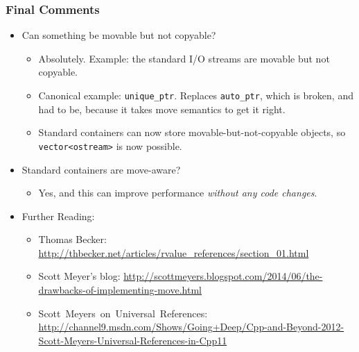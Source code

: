 \begin{frame}[fragile]
\frametitle{Final Comments}
\begin{itemize}

\item Can something be movable but not copyable?
\pause
      \begin{itemize}
      \item Absolutely.  Example: the standard I/O streams are movable but not
      copyable.
      \item Canonical example: \texttt{unique\_ptr}.  Replaces \texttt{auto\_ptr}, which
      is broken, and had to be, because it takes move semantics to get
      it right.
      \item Standard containers can now store
      movable-but-not-copyable objects, so \texttt{vector<ostream>} is now possible.
      \end{itemize}

\vskip 6pt
\pause
\item Standard containers are move-aware?
\pause
      \begin{itemize}
      \item Yes, and this can improve performance \emph{without any
      code changes}.
      \end{itemize}

\vskip 6pt

\pause
\item Further Reading:
      \begin{itemize}
      \item Thomas Becker: {\tiny  \url{http://thbecker.net/articles/rvalue_references/section_01.html}}

      \item  Scott Meyer's blog:
      {\tiny \url{http://scottmeyers.blogspot.com/2014/06/the-drawbacks-of-implementing-move.html}}
      \item \mbox{Scott Meyers on Universal References:}
      {\tiny \url{http://channel9.msdn.com/Shows/Going+Deep/Cpp-and-Beyond-2012-Scott-Meyers-Universal-References-in-Cpp11}}
      \end{itemize}

\end{itemize}

\end{frame}

